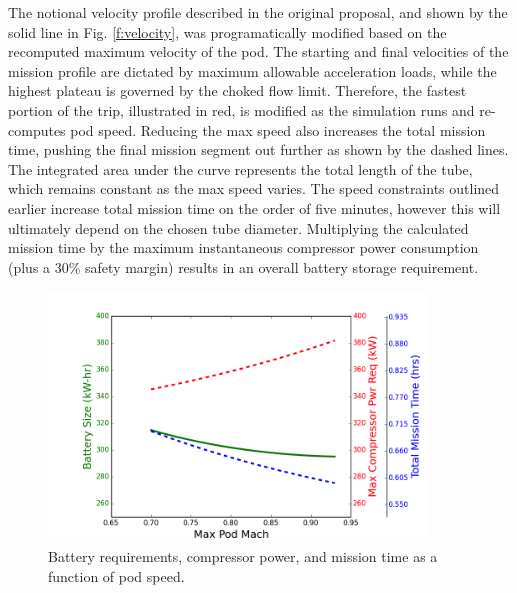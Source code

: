 \documentclass[heading.tex]{subfiles}
\begin{document}
The notional velocity profile described in the original proposal, and shown by the solid line in Fig. \ref{f:velocity},
was programatically modified based on the recomputed maximum velocity of the pod. The starting and final velocities of the
mission profile are dictated by maximum allowable acceleration loads, while the highest plateau is governed by the
choked flow limit. Therefore, the fastest portion of the trip, illustrated in red, is modified as the simulation runs and re-computes pod speed.
Reducing the max speed also increases the total mission time,
pushing the final mission segment out further as shown by the dashed lines.
The integrated area under the curve represents the total length of the tube, which remains constant as the max speed varies.
The speed constraints outlined earlier increase total mission time on the order of five minutes,
however this will ultimately depend on the chosen tube diameter.
Multiplying the calculated mission time by the maximum instantaneous compressor power consumption (plus a 30\% safety margin)
results in an overall battery storage requirement.

\begin{figure}[hbtp]
\centering
\includegraphics[width=0.9\textwidth]{images/battery_plot.png}
\caption[Battery/Compressor/Mission requirements as a function of pod speed]
{Battery requirements, compressor power, and mission time as a function of pod speed.}
\label{f:battery}
\end{figure}
\end{document}
